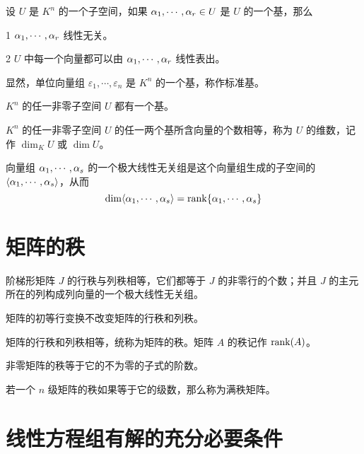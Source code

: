 \begin{definition}[子空间]
	设 $U$ 是 $K^n$ 的一个子空间，如果 $\alpha_1,\cdots,\alpha_r\in U$ 是 $U$ 的一个基，那么

	\num{1} $\alpha_1,\cdots,\alpha_r$ 线性无关。

	\num{2} $U$ 中每一个向量都可以由 $\alpha_1,\cdots,\alpha_r$ 线性表出。
\end{definition}

显然，单位向量组 $\varepsilon_1,\cdots,\varepsilon_n$ 是 $K^n$ 的一个基，称作标准基。

\begin{theorem}
	$K^n$ 的任一非零子空间 $U$ 都有一个基。
\end{theorem}

\begin{theorem}
	$K^n$ 的任一非零子空间 $U$ 的任一两个基所含向量的个数相等，称为 $U$ 的维数，记作 $\dim_KU$ 或 $\dim U$。
\end{theorem}

\begin{theorem}
	向量组 $\alpha_1,\cdots,\alpha_s$ 的一个极大线性无关组是这个向量组生成的子空间的 $\langle \alpha_1,\cdots,\alpha_s \rangle$，从而
	\[\dim\langle \alpha_1,\cdots,\alpha_s \rangle = \operatorname{rank}\{\alpha_1,\cdots,\alpha_s\}\]
\end{theorem}

\section{矩阵的秩}

\begin{theorem}
	阶梯形矩阵 $J$ 的行秩与列秩相等，它们都等于 $J$ 的非零行的个数；并且 $J$ 的主元所在的列构成列向量的一个极大线性无关组。
\end{theorem}

\begin{theorem}
	矩阵的初等行变换不改变矩阵的行秩和列秩。
\end{theorem}

\begin{theorem}
	矩阵的行秩和列秩相等，统称为矩阵的秩。矩阵 $A$ 的秩记作 $\operatorname{rank}(A)$。
\end{theorem}

\begin{theorem}
	非零矩阵的秩等于它的不为零的子式的阶数。
\end{theorem}

若一个 $n$ 级矩阵的秩如果等于它的级数，那么称为满秩矩阵。

\section{线性方程组有解的充分必要条件}

